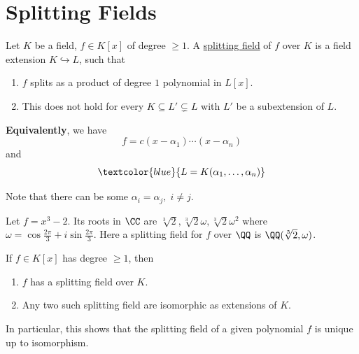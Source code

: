 \section{Splitting Fields}

\begin{definition}
	Let \( K \) be a field, \( f\in K[x] \) of degree \( \ge 1 \). A \underline{splitting field} of \( f \) over
	\( K \) is a field extension \( K \hookrightarrow L \), such that
	\begin{enumerate}
		\item \( f \) splits as a product of degree \( 1 \) polynomial in \( L[x] \).
		\item This does not hold for every \( K \subseteq L' \subsetneq L \) with \( L' \) be a
		      subextension of \( L \).
	\end{enumerate}
	\textbf{Equivalently}, we have
	\[
		f = c(x-\alpha_1)\cdots (x-\alpha_n)
	\]
	and
	\[
		\textcolor{blue}{L = K(\alpha_1,\ldots,\alpha_n)}
	\]
	\begin{note}
		Note that there can be some \( \alpha_i = \alpha_j, \; i \ne j \).
	\end{note}
\end{definition}

\begin{eg}
	Let \( f = x^3 - 2 \). Its roots in \( \CC \) are \( \sqrt[3]{2}, \sqrt[3]{2}\omega, \sqrt[3]{2}\omega^2 \) where
	\( \omega = \cos \frac{2\pi}{3} + i\sin\frac{2\pi}{3} \). Here a splitting field for \( f \) over
	\( \QQ \) is \( \QQ(\sqrt[3]{2}, \omega) \).
\end{eg}

\begin{proposition}
	If \( f \in K[x] \) has degree \( \ge 1 \), then
	\begin{enumerate}
		\item \( f \) has a splitting field over \( K \).
		\item Any two such splitting field are isomorphic as extensions of \( K \).
	\end{enumerate}
	In particular, this shows that the splitting field of a given polynomial \( f \) is unique up to isomorphism.
\end{proposition}


